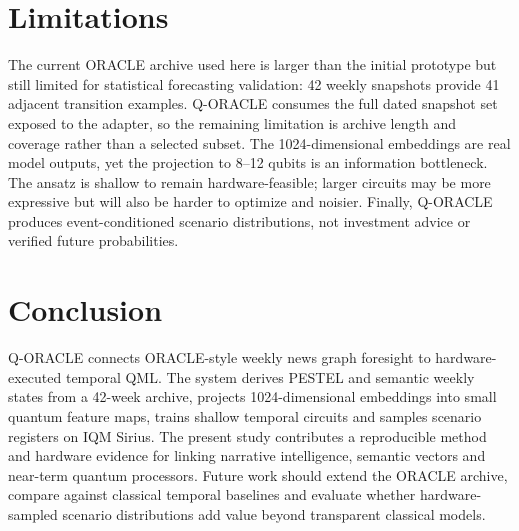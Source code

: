 \documentclass[10pt,twocolumn]{article}
\begin{document}
\section{Limitations}
The current ORACLE archive used here is larger than the initial prototype but still limited for statistical forecasting validation: 42 weekly snapshots provide 41 adjacent transition examples. Q-ORACLE consumes the full dated snapshot set exposed to the adapter, so the remaining limitation is archive length and coverage rather than a selected subset. The 1024-dimensional embeddings are real model outputs, yet the projection to 8--12 qubits is an information bottleneck. The ansatz is shallow to remain hardware-feasible; larger circuits may be more expressive but will also be harder to optimize and noisier. Finally, Q-ORACLE produces event-conditioned scenario distributions, not investment advice or verified future probabilities.

\section{Conclusion}
Q-ORACLE connects ORACLE-style weekly news graph foresight to hardware-executed temporal QML. The system derives PESTEL and semantic weekly states from a 42-week archive, projects 1024-dimensional embeddings into small quantum feature maps, trains shallow temporal circuits and samples scenario registers on IQM Sirius. The present study contributes a reproducible method and hardware evidence for linking narrative intelligence, semantic vectors and near-term quantum processors. Future work should extend the ORACLE archive, compare against classical temporal baselines and evaluate whether hardware-sampled scenario distributions add value beyond transparent classical models.
\end{document}
